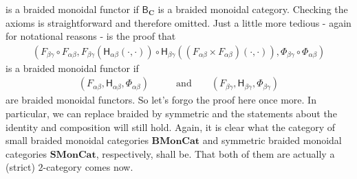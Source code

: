 is a braided monoidal functor if $\mathsf{B}_{\mathbf{C}}$ is a braided monoidal category. Checking the axioms is straightforward and therefore omitted. Just a little more tedious - again for notational reasons - is the proof that
\begin{align*}
  \left(
    F_{\beta\gamma}
    \circ
    F_{\alpha\beta},
    F_{\beta\gamma}
    \left(
      \mathsf{H}_{\alpha\beta}(\cdot,\cdot)
    \right)
    \circ
    \mathsf{H}_{\beta\gamma}
    \left(
      \left(
        F_{\alpha\beta}
        \times
        F_{\alpha\beta}
      \right)
      (\cdot,\cdot)
    \right),
    \Phi_{\beta\gamma}
    \circ
    \Phi_{\alpha\beta}
  \right)
\end{align*}
is a braided monoidal functor if
\begin{align*}
  \left(
    F_{\alpha\beta},
    \mathsf{H}_{\alpha\beta},
    \Phi_{\alpha\beta}
  \right)
  \qquad
  &\text{and}
  \qquad
  \left(
    F_{\beta\gamma},
    \mathsf{H}_{\beta\gamma},
    \Phi_{\beta\gamma}
  \right)
\end{align*}
are braided monoidal functors. So let's forgo the proof here once more. In particular, we can replace braided by symmetric and the statements about the identity and composition will still hold. Again, it is clear what the category of small braided monoidal categories $\mathbf{BMonCat}$ and symmetric braided monoidal categories $\mathbf{SMonCat}$, respectively, shall be. That both of them are actually a (strict) $2$-category comes now.
\\

